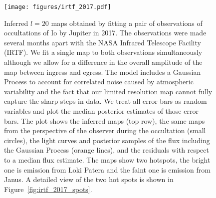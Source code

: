 \documentclass[12pt,dvipsnames]{report}
\begin{document}
\begin{figure}[t!]
    \begin{centering}
    \texttt{[image: figures/irtf\_2017.pdf]}
    \caption{
Inferred $l=20$ maps obtained by fitting a pair of observations of occultations of Io by Jupiter in 2017.
        The observations were made several months apart with the NASA Infrared Telescope Facility (IRTF).
We fit a single map to both observations simultaneously although we allow for a difference in the overall amplitude of the map between ingress and egress.
The model includes a Gaussian Process to account for correlated noise caused by atmospheric variability and the fact that our limited resolution map cannot fully capture the sharp steps in data.
We treat all error bars as random variables and plot the median posterior estimates of those error bars. 
         The plot shows  the inferred maps (top row), the same maps from the perspective of the observer during the occultation (small circles), the light curves and posterior samples of the flux including the Gaussian Process (orange lines), and the residuals with respect to a median flux estimate.
        The maps show two hotspots, the bright one is emission from Loki Patera and the faint one is emission from Janus.
        A detailed view of the two hot spots is shown in Figure~\ref{fig:irtf_2017_spots}.
    }
    \label{fig:irtf_2017}
    \end{centering}
\end{figure}
\end{document}
